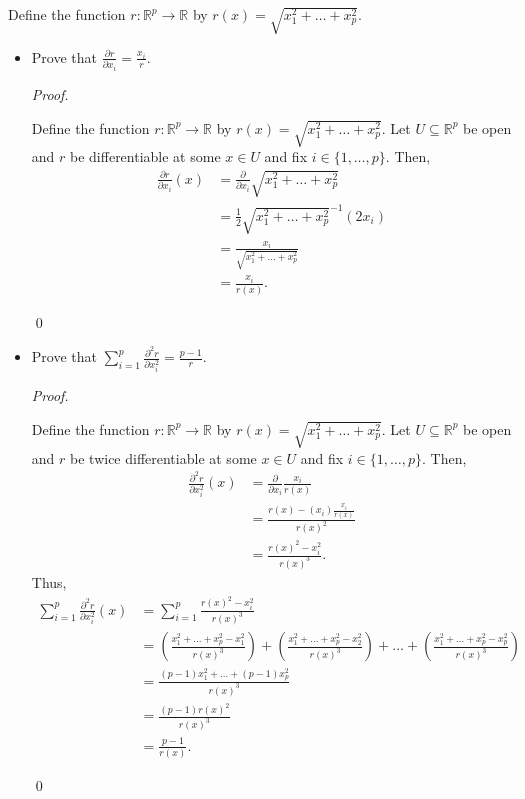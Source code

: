 \documentclass[12pt]{article}
\newenvironment{problem}[2][Problem]{\begin{trivlist}
\item[\hskip \labelsep {\bfseries #1}\hskip \labelsep {\bfseries
#2.}]}{\end{trivlist}}
\newenvironment{sol}
    {\emph{Proof.}
    }
    {
    \qed
    }
\begin{document}
\begin{problem}{13}
  Define the function $r : \mathbb{R}^p \to \mathbb{R}$ by $r(x) = \sqrt{x_1^2 + \dots + x_p^2}$.
  
  \begin{itemize}
      \item[(a)] Prove that $\frac{\partial r}{\partial x_i} = \frac{x_i}{r}$.
      
      \begin{sol}
      Define the function $r : \mathbb{R}^p \to \mathbb{R}$ by $r(x) = \sqrt{x_1^2 + \dots + x_p^2}$. Let $U \subseteq \mathbb{R}^p$ be open and $r$ be differentiable at some $x \in U$ and fix $i \in \{1, \dots, p\}$. Then,
      \begin{align*}
          \frac{\partial r}{\partial x_i}(x) &= \frac{\partial}{\partial x_i} \sqrt{x_1^2 + \dots + x_p^2} \\ &= \frac{1}{2}\sqrt{x_1^2 + \dots + x_p^2}^{-1}(2x_i) \tag*{(By chain rule)} \\ &= \frac{x_i}{\sqrt{x_1^2 + \dots + x_p^2}} \\ &= \frac{x_i}{r(x)}. 
      \end{align*}
      \end{sol}
      
      \item[(b)] Prove that $\sum_{i = 1}^p \frac{\partial^2 r}{\partial x_i^2} = \frac{p-1}{r}$.
      
      \begin{sol}
      Define the function $r : \mathbb{R}^p \to \mathbb{R}$ by $r(x) = \sqrt{x_1^2 + \dots + x_p^2}$. Let $U \subseteq \mathbb{R}^p$ be open and $r$ be twice differentiable at some $x \in U$ and fix $i \in \{1, \dots, p\}$. Then, \begin{align*}
          \frac{\partial^2 r}{\partial x_i^2}(x) &= \frac{\partial}{\partial x_i}\frac{x_i}{r(x)} \\ &= \frac{r(x) - (x_i)\frac{x_i}{r(x)}}{r(x)^2} \tag*{(By quotient rule)} \\ &= \frac{r(x)^2-x_i^2}{r(x)^3}.
      \end{align*}
      Thus, \begin{align*}
          \sum_{i = 1}^p \frac{\partial^2 r}{\partial x_i^2}(x) &= \sum_{i = 1}^p \frac{r(x)^2 - x_i^2}{r(x)^3} \\ &= \left( \frac{x_1^2 + \dots + x_p^2 - x_1^2}{r(x)^3} \right) + \left( \frac{x_1^2 + \dots + x_p^2 - x_2^2}{r(x)^3} \right) + \dots + \left( \frac{x_1^2 + \dots + x_p^2 - x_p^2}{r(x)^3} \right) \\ &= \frac{(p-1)x_1^2 + \dots + (p-1)x_p^2}{r(x)^3} \\ &= \frac{(p-1)r(x)^2}{r(x)^3} \\ &= \frac{p-1}{r(x)}.
      \end{align*}
      \end{sol}
      

\end{itemize}
\end{problem}
\end{document}
